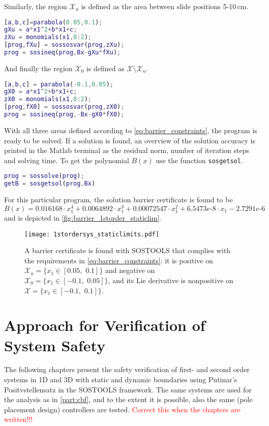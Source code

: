 Similarly, the region $\mathcal{X}_u$ is defined as the area between slide positions 5-10\,cm.
\begin{lstlisting}[language=matlab]
% Define space Xu in X
[a,b,c]=parabola(0.05,0.1);
gXu = a*x1^2+b*x1+c;
zXu = monomials(x1,0:2);
[prog,fXu] = sossosvar(prog,zXu);
prog = sosineq(prog,Bx-gXu*fXu);
\end{lstlisting}
And finally the region $\mathcal{X}_0$ is defined as $\mathcal{X}\setminus\mathcal{X}_u$.
\begin{lstlisting}[language=matlab]
% Define space X0 in X
[a,b,c] = parabola(-0.1,0.05);
gX0 = a*x1^2+b*x1+c;
zX0 = monomials(x1,0:2);
[prog,fX0] = sossosvar(prog,zX0);
prog = sosineq(prog,-Bx-gX0*fX0);
\end{lstlisting}
With all three areas defined according to \autoref{eq:barrier_constraints}, the program is ready to be solved. If a solution is found, an overview of the solution accuracy is printed in the Matlab terminal as the residual norm, number of iteration steps and solving time. To get the polynomial $B(x)$ use the function \verb|sosgetsol|.
\begin{lstlisting}[language=matlab]
% Solve for B
prog = sossolve(prog);
getB = sosgetsol(prog,Bx)
\end{lstlisting}
For this particular program, the solution barrier certificate is found to be
\begin{equation}
B(x) = 0.016168\cdot x_1^4 + 0.0064892\cdot x_1^3 + 0.00072547\cdot x_1^2 + 6.5473e\text{-}8\cdot x_1 - 2.7291e\text{-}6
\end{equation}
and is depicted in \autoref{fig:barrier_1storder_staticlim}.

\begin{figure}[htbp]
	\hspace*{-12mm}
	\texttt{[image: 1stordersys\_staticlimits.pdf]}
	\caption{A barrier certificate is found with SOSTOOLS that complies with the requirements in \autoref{eq:barrier_constraints}: it is positive on $\mathcal{X}_u=\{x_1\in [0.05,\,\,0.1]\}$ and negative on $\mathcal{X}_0=\{x_1\in [-0.1,\,\,0.05]\}$, and its Lie derivative is nonpositive on $\mathcal{X}=\{x_1\in [-0.1,\,\,0.1]\}$.}
	\label{fig:barrier_1storder_staticlim}
\end{figure}

\section{Approach for Verification of System Safety}

The following chapters present the safety verification of first- and second order systems in 1D and 3D with static and dynamic boundaries using Putinar's Positvstellensatz in the SOSTOOLS framework. The same systems are used for the analysis as in \autoref{part:cbf}, and to the extent it is possible, also the same (pole placement design) controllers are tested. \textcolor{red}{Correct this when the chapters are written!!!}

